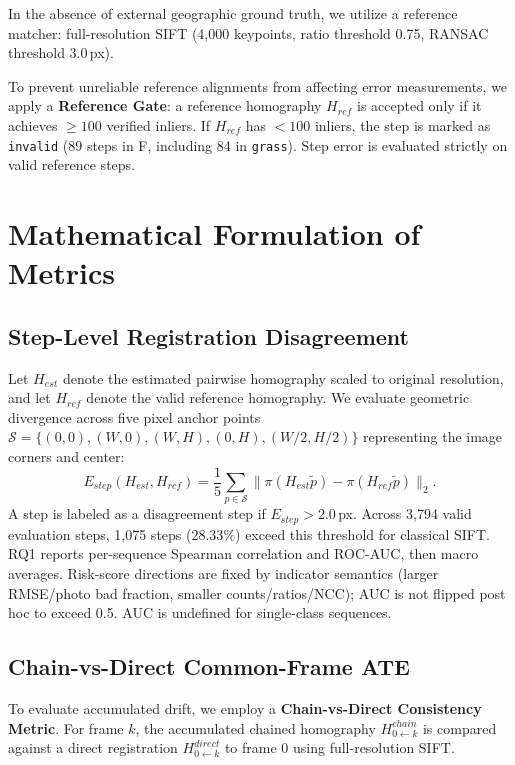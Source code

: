 \documentclass[conference]{IEEEtran}
\begin{document}
In the absence of external geographic ground truth, we utilize a reference matcher: full-resolution SIFT (4,000 keypoints, ratio threshold 0.75, RANSAC threshold 3.0\,px).

To prevent unreliable reference alignments from affecting error measurements, we apply a \textbf{Reference Gate}: a reference homography $H_{ref}$ is accepted only if it achieves $\ge 100$ verified inliers. If $H_{ref}$ has $< 100$ inliers, the step is marked as \texttt{invalid} ($89$ steps in F, including 84 in \texttt{grass}). Step error is evaluated strictly on valid reference steps.

\section{Mathematical Formulation of Metrics}
\label{sec:metrics}

\subsection{Step-Level Registration Disagreement}
\label{subsec:metric_step_error}

Let $H_{est}$ denote the estimated pairwise homography scaled to original resolution, and let $H_{ref}$ denote the valid reference homography. We evaluate geometric divergence across five pixel anchor points $\mathcal{S} = \{ (0, 0), (W, 0), (W, H), (0, H), (W/2, H/2) \}$ representing the image corners and center:
\begin{equation}
E_{step}(H_{est}, H_{ref}) = \frac{1}{5} \sum_{p \in \mathcal{S}} \| \pi(H_{est} \tilde{p}) - \pi(H_{ref} \tilde{p}) \|_2.
\label{eq:step_error}
\end{equation}
A step is labeled as a disagreement step if $E_{step} > 2.0$\,px. Across 3,794 valid evaluation steps, 1,075 steps ($28.33\%$) exceed this threshold for classical SIFT.
RQ1 reports per-sequence Spearman correlation and ROC-AUC, then macro averages. Risk-score directions are fixed by indicator semantics (larger RMSE/photo bad fraction, smaller counts/ratios/NCC); AUC is not flipped post hoc to exceed 0.5. AUC is undefined for single-class sequences.

\subsection{Chain-vs-Direct Common-Frame ATE}
\label{subsec:metric_ate}

To evaluate accumulated drift, we employ a \textbf{Chain-vs-Direct Consistency Metric}. For frame $k$, the accumulated chained homography $H_{0 \leftarrow k}^{chain}$ is compared against a direct registration $H_{0 \leftarrow k}^{direct}$ to frame 0 using full-resolution SIFT.
\end{document}
